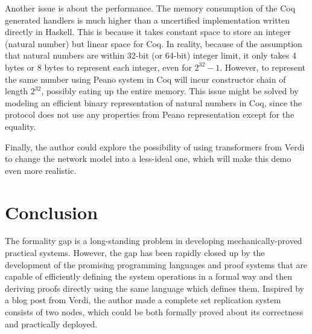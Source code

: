 \documentclass[twocolumn]{article}
\begin{document}
Another issue is about the performance. The memory consumption of the Coq
generated handlers is much higher than a uncertified implementation written directly
in Haskell. This is because it takes constant space to store an integer
(natural number) but linear space for Coq. In reality, because of the
assumption that natural numbers are within 32-bit (or 64-bit) integer limit, it
only takes 4 bytes or 8 bytes to represent each integer, even for $2^{32}-1$.
However, to represent the same number using Peano system in Coq will incur
constructor chain of length $2^{32}$, possibly eating up the entire memory.
This issue might be solved by modeling an efficient binary representation of
natural numbers in Coq, since the protocol does not use any properties from
Peano representation except for the equality.

Finally, the author could explore the possibility of using transformers from
Verdi to change the network model into a less-ideal one, which will make this
demo even more realistic.
\section{Conclusion}
The formality gap is a long-standing problem in developing mechanically-proved
practical systems. However, the gap has been rapidly closed up by the
development of the promising programming languages and proof systems that are
capable of efficiently defining the system operations in a formal way and then
deriving proofs directly using the same language which defines them. Inspired by a
blog post from Verdi, the author made a complete set replication system
consists of two nodes, which could be both formally proved about its
correctness and practically deployed.
{}

\end{document}
